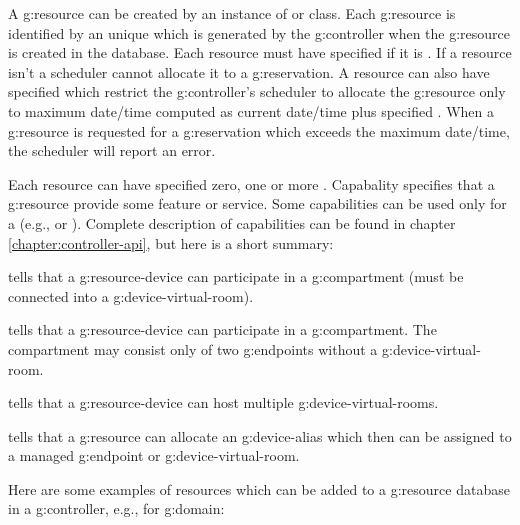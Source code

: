 A \gls{g:resource} can be created by an instance of  or  class. Each \gls{g:resource} is identified by an unique  which is generated by the \gls{g:controller} when the \gls{g:resource} is created in the database. Each resource must have specified if it is . If a resource isn't  a scheduler cannot allocate it to a \gls{g:reservation}. A resource can also have specified  which restrict the \gls{g:controller}'s scheduler to allocate the \gls{g:resource} only to maximum date/time computed as current date/time plus specified . When a \gls{g:resource} is requested for a \gls{g:reservation} which exceeds the maximum date/time, the scheduler will report an error.

Each resource can have specified zero, one or more . Capabality specifies that a \gls{g:resource} provide some feature or service. Some capabilities can be used only for a  (e.g.,  or ). Complete description of capabilities can be found in chapter \ref{chapter:controller-api}, but here is a short summary:
\begin{compactitem}
\item {} tells that a \gls{g:resource-device} can participate in a \gls{g:compartment} (must be connected into a \gls{g:device-virtual-room}).
\item {} tells that a \gls{g:resource-device} can participate in a \gls{g:compartment}. The compartment may consist only of two \glspl{g:endpoint} without a \gls{g:device-virtual-room}.
\item {} tells that a \gls{g:resource-device} can host multiple \glspl{g:device-virtual-room}.
\item {} tells that a \gls{g:resource} can allocate an \gls{g:device-alias} which then can be assigned to a managed \gls{g:endpoint} or \gls{g:device-virtual-room}.
\end{compactitem}

Here are some examples of resources which can be added to a \gls{g:resource} database in a \gls{g:controller}, e.g., for  \gls{g:domain}:

